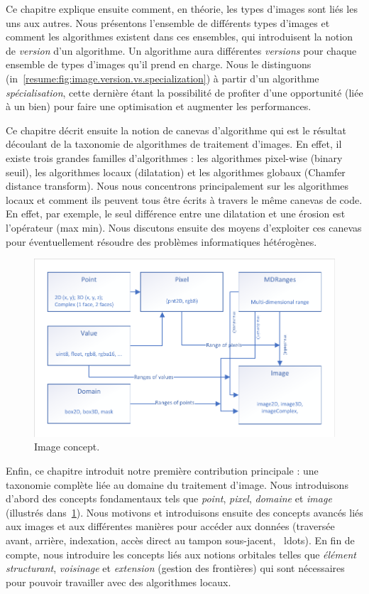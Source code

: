 Ce chapitre explique ensuite comment, en théorie, les types d'images sont liés les uns aux autres. Nous présentons
l'ensemble de différents types d'images et comment les algorithmes existent dans ces ensembles, qui introduisent la
notion de \emph{version} d'un algorithme. Un algorithme aura différentes \emph{versions} pour chaque ensemble de types
d'images qu'il prend en charge. Nous le distinguons (in~\cref{resume:fig:image.version.vs.specialization}) à partir d'un
algorithme \emph{spécialisation}, cette dernière étant la possibilité de profiter d'une opportunité (liée à un bien)
pour faire une optimisation et augmenter les performances.

Ce chapitre décrit ensuite la notion de canevas d'algorithme qui est le résultat découlant de la taxonomie de
algorithmes de traitement d'images. En effet, il existe trois grandes familles d'algorithmes : les algorithmes pixel-wise (binary
seuil), les algorithmes locaux (dilatation) et les algorithmes globaux (Chamfer distance transform). Nous nous concentrons principalement
sur les algorithmes locaux et comment ils peuvent tous être écrits à travers le même canevas de code. En effet, par exemple, le seul
différence entre une dilatation et une érosion est l'opérateur (max \vs min). Nous discutons ensuite des moyens d'exploiter ces canevas
pour éventuellement résoudre des problèmes informatiques hétérogènes.

\begin{figure}[htbp]
  \centering
  \includegraphics[width=.8\linewidth]{../figures/concepts/image}
  \caption[]{Image concept.}
  \label{resume:fig:concept.image}
\end{figure}

Enfin, ce chapitre introduit notre première contribution principale : une taxonomie complète liée au domaine du traitement d'image.
Nous introduisons d'abord des concepts fondamentaux tels que \emph{point}, \emph{pixel}, \emph{domaine} et \emph{image} (illustrés
dans~\cref{resume:fig:concept.image}). Nous motivons et introduisons ensuite des concepts avancés liés aux images et aux différentes manières
pour accéder aux données (traversée avant, arrière, indexation, accès direct au tampon sous-jacent, \ ldots). En fin de compte, nous
introduire les concepts liés aux notions orbitales telles que \emph{élément structurant}, \emph{voisinage} et
\emph{extension} (gestion des frontières) qui sont nécessaires pour pouvoir travailler avec des algorithmes locaux.

